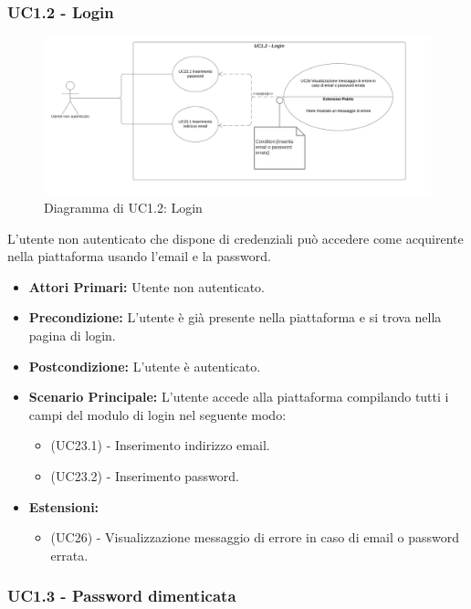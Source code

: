 \subsubsection{UC1.2 - Login}\label{UC1.2}

\begin{figure}[H]
    \centering
    \includegraphics[scale=0.6]{Immagini/DiagrammiUC/UC1.2Login.png}
    \caption{Diagramma di UC1.2: Login} 
    \label{fig:Login}
\end{figure}

L'utente non autenticato che dispone di credenziali può accedere come acquirente nella piattaforma usando l'email e la password.
\begin{itemize}
    \item \textbf{Attori Primari:} Utente non autenticato.
    \item \textbf{Precondizione:} L'utente è già presente nella piattaforma e si trova nella pagina di login.
    \item \textbf{Postcondizione:} L'utente è autenticato.
    \item \textbf{Scenario Principale:} L'utente accede alla piattaforma compilando tutti i campi del modulo di login nel seguente modo:
    \begin{itemize}
        \item (UC23.1) - Inserimento indirizzo email.
        \item (UC23.2) - Inserimento password.
    \end{itemize}
    \item \textbf{Estensioni:}
    \begin{itemize}
        \item (UC26) - Visualizzazione messaggio di errore in caso di email o password errata.
    \end{itemize}
\end{itemize}

\subsubsection{UC1.3 - Password dimenticata}\label{UC1.3}

